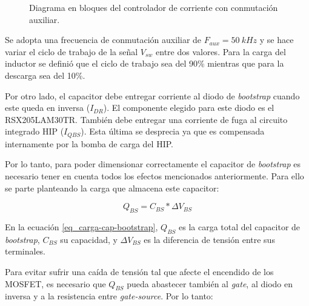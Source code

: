 \begin{figure}[H]
	\centering
	\scalebox{0.8}{}
	\caption{Diagrama en bloques del controlador de corriente con conmutación auxiliar.}	\label{fig:img_diag-en-bloques-con-oscilador}
\end{figure}

\noindent Se adopta una frecuencia de conmutación auxiliar de $F_{aux}=50\:kHz$ y se hace variar el ciclo de trabajo de la señal $V_{sw}$ entre dos valores. Para la carga del inductor se definió que el ciclo de trabajo sea del 90\% mientras que para la descarga sea del 10\%.

%



\noindent Por otro lado, el capacitor debe entregar corriente al diodo de \textsl{bootstrap} cuando este queda en inversa ($I_{DR}$). El componente elegido para este diodo es el RSX205LAM30TR. También debe entregar una corriente de fuga al circuito integrado HIP ($I_{QBS}$). Esta última se desprecia ya que es compensada internamente por la bomba de carga del HIP.

\noindent Por lo tanto, para poder dimensionar correctamente el capacitor de \textsl{bootstrap} es necesario tener en cuenta todos los efectos mencionados anteriormente. Para ello se parte planteando la carga que almacena este capacitor:

\begin{equation} \label{eq_carga-cap-bootstrap}
	Q_{BS}=C_{BS}*\Delta V_{BS}
\end{equation}

\noindent En la ecuación \ref{eq_carga-cap-bootstrap}, $Q_{BS}$ es la carga total del capacitor de \textsl{bootstrap}, $C_{BS}$ su capacidad, y $\Delta V_{BS}$ es la diferencia de  tensión entre sus terminales. 

\noindent Para evitar sufrir una caída de tensión tal que afecte el encendido de los MOSFET, es necesario que $Q_{BS}$ pueda abastecer también al \textsl{gate}, al diodo en inversa y a la resistencia entre \textsl{gate-source}. Por lo tanto:

